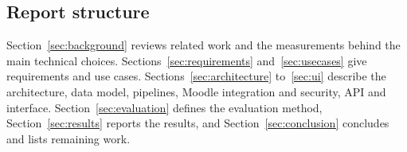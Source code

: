 \subsection{Report structure}
Section~\ref{sec:background} reviews related work and the measurements behind the main technical choices. Sections~\ref{sec:requirements} and~\ref{sec:usecases} give requirements and use cases. Sections~\ref{sec:architecture} to~\ref{sec:ui} describe the architecture, data model, pipelines, Moodle integration and security, API and interface. Section~\ref{sec:evaluation} defines the evaluation method, Section~\ref{sec:results} reports the results, and Section~\ref{sec:conclusion} concludes and lists remaining work.
